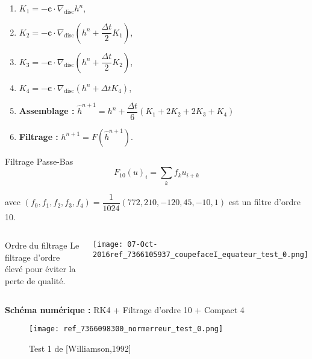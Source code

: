\documentclass[11pt]{beamer}
\begin{document}
\begin{frame}
\begin{enumerate}
\item $K_1 = - \mathbf{c} \cdot \nabla_{\text{disc}} h^n$,

\item $K_2 = - \mathbf{c} \cdot \nabla_{\text{disc}} \left(h^n + \dfrac{\Delta t}{2} K_1\right)$,

\item $K_3 = - \mathbf{c} \cdot \nabla_{\text{disc}} \left(h^n + \dfrac{\Delta t}{2} K_2\right)$,

\item $K_4 = - \mathbf{c} \cdot \nabla_{\text{disc}} \left(h^n + \Delta t K_4\right)$,

\item \textbf{Assemblage :} $\widehat{h}^{n+1} = h^n + \dfrac{\Delta t}{6} \left( K_1 + 2 K_2 + 2 K_3 + K_4  \right)$

\item \textbf{Filtrage :} $h^{n+1} = F(\widehat{h}^{n+1}) $.
\end{enumerate}


\begin{block}{Filtrage Passe-Bas}
\begin{equation}
F_{10}(u)_{i} = \sum_k f_k u_{i+k}
\end{equation}

avec $(f_0, f_1, f_2, f_3, f_4) = \dfrac{1}{1024}(772, 210, -120, 45, -10, 1)$ est un filtre d'ordre 10.

\end{block}
\end{frame}

\begin{frame}
\begin{columns}

\begin{block}{Ordre du filtrage}
Le filtrage d'ordre élevé pour éviter la perte de qualité.
\end{block}

\begin{center}
\texttt{[image: 07-Oct-2016ref\_7366105937\_coupefaceI\_equateur\_test\_0.png]}
\end{center}


\end{columns}
\end{frame}

\begin{frame}

\textbf{Schéma numérique :} RK4 + Filtrage d'ordre 10 + Compact 4

\begin{figure}
\begin{center}
\texttt{[image: ref\_7366098300\_normerreur\_test\_0.png]}
\end{center}
\caption{Test 1 de [Williamson,1992] }
\end{figure}

\end{frame}
\end{document}
